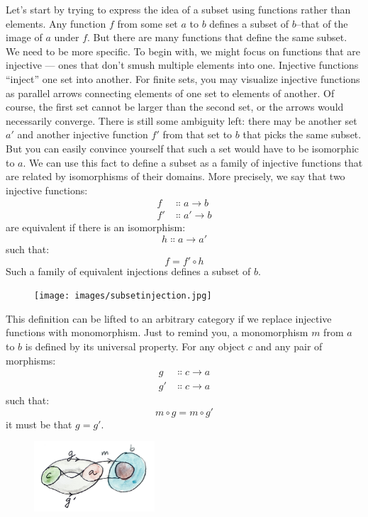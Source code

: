 Let's start by trying to express the idea of a subset using functions
rather than elements. Any function $f$ from some set $a$
to $b$ defines a subset of $b$--that of the image of
$a$ under $f$. But there are many functions that define
the same subset. We need to be more specific. To begin with, we might
focus on functions that are injective --- ones that don't smush multiple
elements into one. Injective functions ``inject'' one set into another.
For finite sets, you may visualize injective functions as parallel
arrows connecting elements of one set to elements of another. Of course,
the first set cannot be larger than the second set, or the arrows would
necessarily converge. There is still some ambiguity left: there may be
another set $a'$ and another injective function
$f'$ from that set to $b$ that picks the same
subset. But you can easily convince yourself that such a set would have
to be isomorphic to $a$. We can use this fact to define a subset
as a family of injective functions that are related by isomorphisms of
their domains. More precisely, we say that two injective functions:
\begin{align*}
  f  & \Colon a \to b  \\
  f' & \Colon a' \to b
\end{align*}
are equivalent if there is an isomorphism:
\[h \Colon a \to a'\]
such that:
\[f = f' \circ h\]
Such a family of equivalent injections defines a subset of $b$.

\begin{figure}[H]
  \centering
  \texttt{[image: images/subsetinjection.jpg]}
\end{figure}

\noindent
This definition can be lifted to an arbitrary category if we replace
injective functions with monomorphism. Just to remind you, a
monomorphism $m$ from $a$ to $b$ is defined by its
universal property. For any object $c$ and any pair of morphisms:
\begin{align*}
  g  & \Colon c \to a \\
  g' & \Colon c \to a
\end{align*}
such that:
\[m \circ g = m \circ g'\]
it must be that $g = g'$.

\begin{figure}[H]
  \centering
  \includegraphics[width=0.4\textwidth]{images/monomorphism.jpg}
\end{figure}

